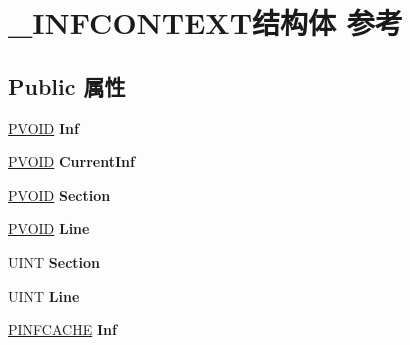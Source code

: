 \hypertarget{struct___i_n_f_c_o_n_t_e_x_t}{}\section{\+\_\+\+I\+N\+F\+C\+O\+N\+T\+E\+X\+T结构体 参考}
\label{struct___i_n_f_c_o_n_t_e_x_t}
\subsection*{Public 属性}
\begin{DoxyCompactItemize}
\item 
\mbox{\label{struct___i_n_f_c_o_n_t_e_x_t_a080fd42e011ab6029647fc4471e3ebfd}} 
\hyperlink{interfacevoid}{P\+V\+O\+ID} {\bfseries Inf}
\item 
\mbox{\label{struct___i_n_f_c_o_n_t_e_x_t_aa7b66549098ca3c5e474ba351b167a13}} 
\hyperlink{interfacevoid}{P\+V\+O\+ID} {\bfseries Current\+Inf}
\item 
\mbox{\label{struct___i_n_f_c_o_n_t_e_x_t_a6a11542bc250c2f6b68226e990fc0036}} 
\hyperlink{interfacevoid}{P\+V\+O\+ID} {\bfseries Section}
\item 
\mbox{\label{struct___i_n_f_c_o_n_t_e_x_t_a1b126311c200f46a5e40942e9623e81a}} 
\hyperlink{interfacevoid}{P\+V\+O\+ID} {\bfseries Line}
\item 
\mbox{\label{struct___i_n_f_c_o_n_t_e_x_t_af4edd14f31892908fdcc39ad80295614}} 
U\+I\+NT {\bfseries Section}
\item 
\mbox{\label{struct___i_n_f_c_o_n_t_e_x_t_a6272ac9dafdee312c2dd771a6694bb81}} 
U\+I\+NT {\bfseries Line}
\item 
\mbox{\label{struct___i_n_f_c_o_n_t_e_x_t_adba656b7a209c1bd60134605d48887aa}} 
\hyperlink{struct___i_n_f_c_a_c_h_e}{P\+I\+N\+F\+C\+A\+C\+HE} {\bfseries Inf}
\item 
\mbox{\label{struct___i_n_f_c_o_n_t_e_x_t_acb4362eb4dfe0764733351451f0c998b}} 

\end{DoxyCompactItemize}

